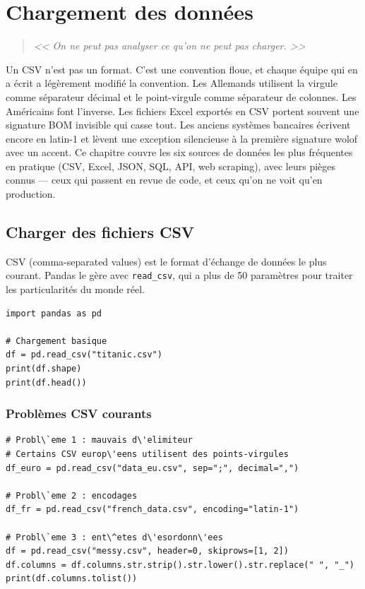\chapter{Chargement des donn\'ees}
\label{ch:data-loading}

\begin{quote}
\emph{<< On ne peut pas analyser ce qu'on ne peut pas charger. >>}
\end{quote}

Un CSV n'est pas un format. C'est une convention floue, et chaque équipe qui en a écrit a légèrement modifié la convention. Les Allemands utilisent la virgule comme séparateur décimal et le point-virgule comme séparateur de colonnes. Les Américains font l'inverse. Les fichiers Excel exportés en CSV portent souvent une signature BOM invisible qui casse tout. Les anciens systèmes bancaires écrivent encore en latin-1 et lèvent une exception silencieuse à la première signature wolof avec un accent. Ce chapitre couvre les six sources de données les plus fréquentes en pratique (CSV, Excel, JSON, SQL, API, web scraping), avec leurs pièges connus --- ceux qui passent en revue de code, et ceux qu'on ne voit qu'en production.
\section{Charger des fichiers CSV}

CSV (comma-separated values) est le format d'\'echange de donn\'ees le plus courant. Pandas le g\`ere avec \texttt{read\_csv}, qui a plus de 50 param\`etres pour traiter les particularit\'es du monde r\'eel.

\begin{verbatim}
import pandas as pd

# Chargement basique
df = pd.read_csv("titanic.csv")
print(df.shape)
print(df.head())
\end{verbatim}

\subsection{Probl\`emes CSV courants}

\begin{verbatim}
# Probl\`eme 1 : mauvais d\'elimiteur
# Certains CSV europ\'eens utilisent des points-virgules
df_euro = pd.read_csv("data_eu.csv", sep=";", decimal=",")

# Probl\`eme 2 : encodages
df_fr = pd.read_csv("french_data.csv", encoding="latin-1")

# Probl\`eme 3 : ent\^etes d\'esordonn\'ees
df = pd.read_csv("messy.csv", header=0, skiprows=[1, 2])
df.columns = df.columns.str.strip().str.lower().str.replace(" ", "_")
print(df.columns.tolist())
\end{verbatim}

